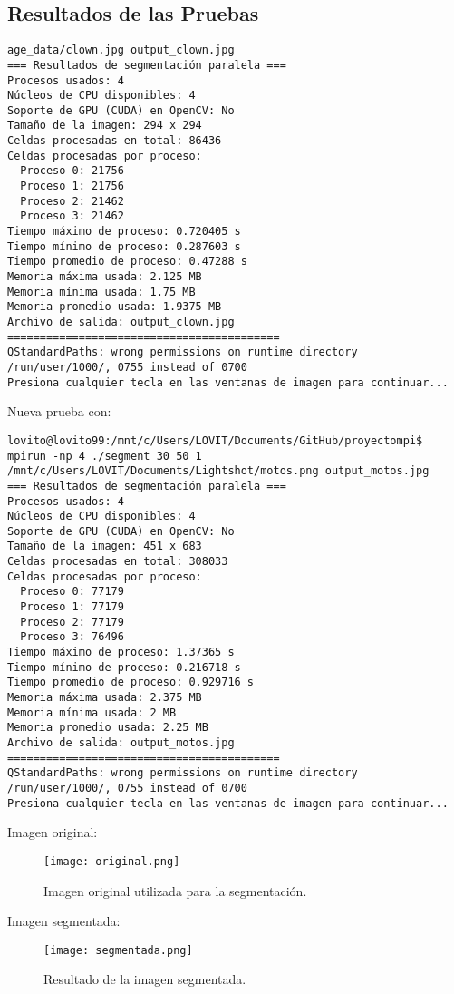 \documentclass[fleqn,10pt]{article}
\begin{document}
\subsection{Resultados de las Pruebas}
\begin{verbatim}
age_data/clown.jpg output_clown.jpg
=== Resultados de segmentación paralela ===
Procesos usados: 4
Núcleos de CPU disponibles: 4
Soporte de GPU (CUDA) en OpenCV: No
Tamaño de la imagen: 294 x 294
Celdas procesadas en total: 86436
Celdas procesadas por proceso:
  Proceso 0: 21756
  Proceso 1: 21756
  Proceso 2: 21462
  Proceso 3: 21462
Tiempo máximo de proceso: 0.720405 s
Tiempo mínimo de proceso: 0.287603 s
Tiempo promedio de proceso: 0.47288 s
Memoria máxima usada: 2.125 MB
Memoria mínima usada: 1.75 MB
Memoria promedio usada: 1.9375 MB
Archivo de salida: output_clown.jpg
==========================================
QStandardPaths: wrong permissions on runtime directory /run/user/1000/, 0755 instead of 0700
Presiona cualquier tecla en las ventanas de imagen para continuar...
\end{verbatim}

Nueva prueba con:

\begin{verbatim}
lovito@lovito99:/mnt/c/Users/LOVIT/Documents/GitHub/proyectompi$ mpirun -np 4 ./segment 30 50 1 /mnt/c/Users/LOVIT/Documents/Lightshot/motos.png output_motos.jpg
=== Resultados de segmentación paralela ===
Procesos usados: 4
Núcleos de CPU disponibles: 4
Soporte de GPU (CUDA) en OpenCV: No
Tamaño de la imagen: 451 x 683
Celdas procesadas en total: 308033
Celdas procesadas por proceso:
  Proceso 0: 77179
  Proceso 1: 77179
  Proceso 2: 77179
  Proceso 3: 76496
Tiempo máximo de proceso: 1.37365 s
Tiempo mínimo de proceso: 0.216718 s
Tiempo promedio de proceso: 0.929716 s
Memoria máxima usada: 2.375 MB
Memoria mínima usada: 2 MB
Memoria promedio usada: 2.25 MB
Archivo de salida: output_motos.jpg
==========================================
QStandardPaths: wrong permissions on runtime directory /run/user/1000/, 0755 instead of 0700
Presiona cualquier tecla en las ventanas de imagen para continuar...
\end{verbatim}

Imagen original:
\begin{figure}[ht]
    \centering
    \texttt{[image: original.png]}
    \caption{Imagen original utilizada para la segmentación.}
    \label{fig:original}
\end{figure}

Imagen segmentada:
\begin{figure}[ht]
    \centering
    \texttt{[image: segmentada.png]}
    \caption{Resultado de la imagen segmentada.}
    \label{fig:segmentada}
\end{figure}
\end{document}
